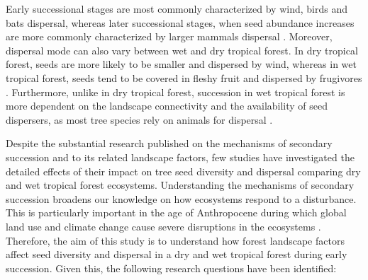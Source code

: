 Early successional stages are most commonly characterized by wind, birds and bats dispersal, whereas later successional stages, when seed abundance increases are more commonly characterized by larger mammals dispersal \citep{dentUnitingNicheDifferentiation2021}. Moreover, dispersal mode can also vary between wet and dry tropical forest. In dry tropical forest, seeds are more likely to be smaller and dispersed by wind, whereas in wet tropical forest, seeds tend to be covered in fleshy fruit and dispersed by frugivores \citep{vieiraPrinciplesNaturalRegeneration2006, dentUnitingNicheDifferentiation2021}. Furthermore, unlike in dry tropical forest, succession in wet tropical forest is more dependent on the landscape connectivity and the availability of seed dispersers, as most tree species rely on animals for dispersal \citep{hordijkLandUseHistory2024, lohbeckSuccessionalChangesFunctional2013}.


Despite the substantial research published on the mechanisms of secondary succession and to its related landscape factors, few studies have investigated the detailed effects of their impact on tree seed diversity and dispersal comparing dry and wet tropical forest ecosystems. Understanding the mechanisms of secondary succession broadens our knowledge on how ecosystems respond to a disturbance. This is particularly important in the age of Anthropocene during which global land use and climate change cause severe disruptions in the ecosystems \citep{poorterSuccessionalTheories2023}.  Therefore, the aim of this study is to understand how forest landscape factors affect seed diversity and dispersal in a dry and wet tropical forest during early succession. Given this, the following research questions have been identified: 

